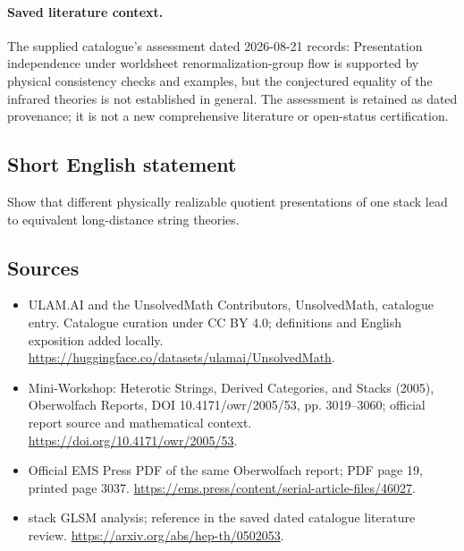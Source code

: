 \documentclass[11pt]{article}
\begin{document}
\paragraph{Saved literature context.} The supplied catalogue's assessment dated 2026-08-21 records: Presentation independence under worldsheet renormalization-group flow is supported by physical consistency checks and examples, but the conjectured equality of the infrared theories is not established in general. The assessment is retained as dated provenance; it is not a new comprehensive literature or open-status certification.
\subsection{Short English statement}
Show that different physically realizable quotient presentations of one stack lead to equivalent long-distance string theories.
\subsection{Sources}
\begin{itemize}
\item[\hypertarget{source:statement:1}{S1}] ULAM.AI and the UnsolvedMath Contributors, UnsolvedMath, catalogue entry. Catalogue curation under CC BY 4.0; definitions and English exposition added locally.
\url{https://huggingface.co/datasets/ulamai/UnsolvedMath}.
\item[\hypertarget{source:statement:2}{S2}] Mini-Workshop: Heterotic Strings, Derived Categories, and Stacks (2005), Oberwolfach Reports, DOI 10.4171/owr/2005/53, pp. 3019--3060; official report source and mathematical context.
\url{https://doi.org/10.4171/owr/2005/53}.
\item[\hypertarget{source:statement:3}{S3}] Official EMS Press PDF of the same Oberwolfach report; PDF page 19, printed page 3037.
\url{https://ems.press/content/serial-article-files/46027}.
\item[\hypertarget{source:statement:4}{S4}] stack GLSM analysis; reference in the saved dated catalogue literature review.
\url{https://arxiv.org/abs/hep-th/0502053}.
\end{itemize}
\label{end:statement}
\end{document}
